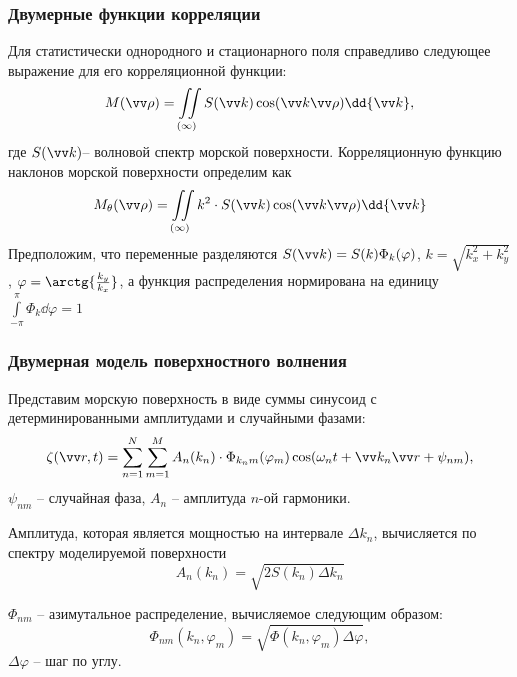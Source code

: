 \documentclass[10pt,pdf,hyperref={unicode}, dvipsnames]{beamer}
\renewcommand{\phi}{\varphi}
\renewcommand{\vec}{\vv}
\begin{document}
\begin{frame}
	\frametitle{Двумерные функции корреляции}
	Для статистически однородного и стационарного поля справедливо следующее выражение для его корреляционной функции:
	\begin{equation}
		M(\vec \rho)= \iint\limits_{(\infty)} S(\vec k) \cos(\vec k \vec \rho) \dd{\vec k},
	\end{equation}
	где $S(\vec k)$-- волновой спектр морской поверхности.
	Корреляционную функцию наклонов морской поверхности определим как
	\begin{equation}
		M_{\theta} (\vec \rho) = \iint\limits_{(\infty)} k^2 \cdot S(\vec k) \cos(\vec k \vec \rho) \dd{ \vec k}
	\end{equation}
	Предположим, что переменные разделяются $S(\vec k)=S(k) \Phi_k(\phi)$,
	$k=\sqrt{k_x^2+k_y^2}$, $\phi=\arctg{\frac{k_y}{k_x}}$, а функция распределения нормирована на единицу $\int\limits_{-\pi}^{\pi} \Phi_k \dd{\phi}=1$
\end{frame}


\begin{frame}[t]

	\frametitle{Двумерная модель поверхностного волнения}
	Представим морскую поверхность в виде суммы синусоид с детерминированными амплитудами и случайными фазами:
\begin{equation}
	\zeta(\vec r, t)= \sum\limits_{n=1}^N \sum_{m=1}^M A_n(k_n)\cdot 
		\Phi_{k_nm}(\phi_m) \cos(\omega_n t + \vec k_n \vec r + \psi_{nm}),
\end{equation}
$\psi_{nm}$ -- случайная фаза, $A_n$ -- амплитуда $n$-ой гармоники.

Амплитуда, которая является мощностью на интервале $\Delta k_n$, вычисляется по спектру моделируемой поверхности
\begin{equation}
	A_n(k_n)=\sqrt{2 S(k_n) \Delta k_n}
\end{equation}

$\Phi_{nm}$ -- азимутальное распределение, вычисляемое следующим образом:
\begin{equation}
	\Phi_{nm}(k_n,\phi_m)=\sqrt{\Phi(k_n,\phi_m) \Delta \phi},
\end{equation}
$\Delta \phi$ -- шаг по углу.

\end{frame}
\end{document}
